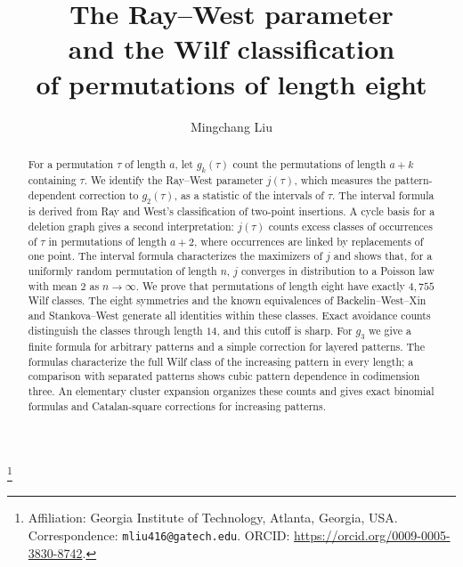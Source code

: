 \documentclass[11pt,reqno]{amsart}
\theoremstyle{plain}
\theoremstyle{definition}
\theoremstyle{remark}
\newcommand{\Sym}{\mathfrak{S}}
\begin{document}
\title[The Ray--West parameter and the Wilf classification of $\Sym_8$]{The Ray--West parameter\\ and the Wilf classification\\ of permutations of length eight}

\author{Mingchang Liu}
\thanks{Affiliation: Georgia Institute of Technology, Atlanta, Georgia, USA. Correspondence: \texttt{mliu416@gatech.edu}. ORCID: \url{https://orcid.org/0009-0005-3830-8742}.}
\address{Georgia Institute of Technology, Atlanta, Georgia, USA}
\date{}


\begin{abstract}
For a permutation $\tau$ of length $a$, let $g_k(\tau)$ count the
permutations of length $a+k$ containing $\tau$. We identify the
Ray--West parameter $j(\tau)$, which measures the pattern-dependent
correction to $g_2(\tau)$, as a statistic of the intervals of $\tau$.
The interval formula is derived from Ray and West's classification of two-point
insertions. A cycle basis for a deletion graph gives a second
interpretation: $j(\tau)$ counts excess classes of occurrences of $\tau$
in permutations of length $a+2$, where occurrences are linked by
replacements of one point. The interval formula characterizes the
maximizers of $j$ and shows that, for a uniformly random permutation of length
$n$, $j$ converges in distribution to a Poisson law with mean $2$ as
$n\to\infty$.
We prove that permutations of length eight have exactly $4{,}755$
Wilf classes. The eight symmetries and the known equivalences of
Backelin--West--Xin and Stankova--West generate all identities within
these classes. Exact avoidance counts distinguish the classes through
length $14$, and this cutoff is sharp.
For $g_3$ we give a finite formula for arbitrary patterns and a simple
correction for layered patterns. The formulas characterize the full
Wilf class of the increasing pattern in every length; a comparison with
separated patterns shows cubic pattern dependence in codimension three. An elementary cluster
expansion organizes these counts and gives exact binomial formulas and
Catalan-square corrections for increasing patterns.
\end{abstract}

\maketitle
\end{document}

